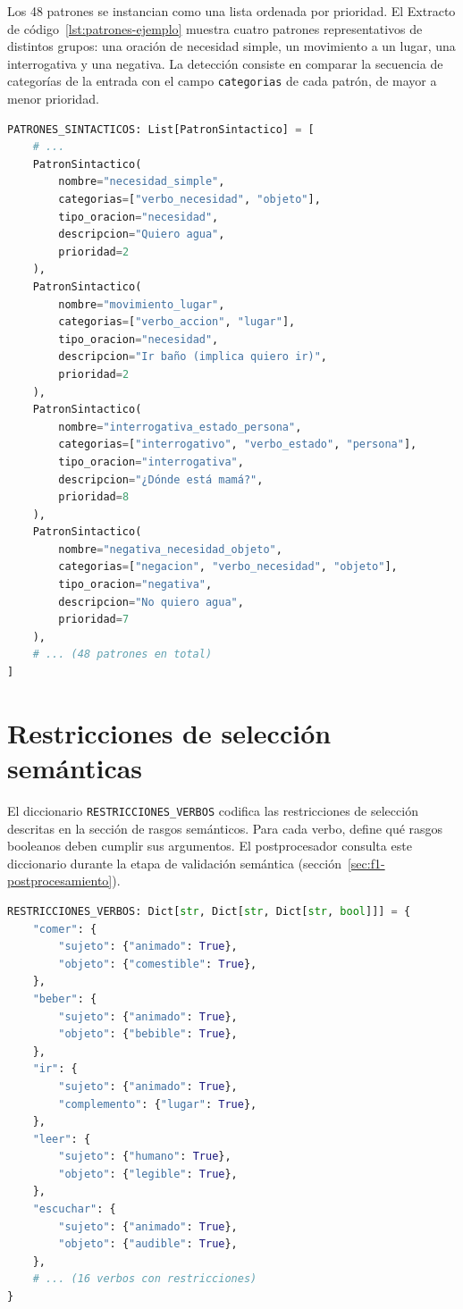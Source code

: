 Los 48 patrones se instancian como una lista ordenada por prioridad. El Extracto de código~\ref{lst:patrones-ejemplo} muestra cuatro patrones representativos de distintos grupos: una oración de necesidad simple, un movimiento a un lugar, una interrogativa y una negativa. La detección consiste en comparar la secuencia de categorías de la entrada con el campo \texttt{categorias} de cada patrón, de mayor a menor prioridad.

\begin{lstlisting}[language=Python,caption={Cuatro patrones sintácticos representativos (\texttt{parser.py}).},label={lst:patrones-ejemplo},basicstyle=\ttfamily\small,xleftmargin=1cm]
PATRONES_SINTACTICOS: List[PatronSintactico] = [
    # ...
    PatronSintactico(
        nombre="necesidad_simple",
        categorias=["verbo_necesidad", "objeto"],
        tipo_oracion="necesidad",
        descripcion="Quiero agua",
        prioridad=2
    ),
    PatronSintactico(
        nombre="movimiento_lugar",
        categorias=["verbo_accion", "lugar"],
        tipo_oracion="necesidad",
        descripcion="Ir baño (implica quiero ir)",
        prioridad=2
    ),
    PatronSintactico(
        nombre="interrogativa_estado_persona",
        categorias=["interrogativo", "verbo_estado", "persona"],
        tipo_oracion="interrogativa",
        descripcion="¿Dónde está mamá?",
        prioridad=8
    ),
    PatronSintactico(
        nombre="negativa_necesidad_objeto",
        categorias=["negacion", "verbo_necesidad", "objeto"],
        tipo_oracion="negativa",
        descripcion="No quiero agua",
        prioridad=7
    ),
    # ... (48 patrones en total)
]
\end{lstlisting}

\section{Restricciones de selección semánticas}

El diccionario \texttt{RESTRICCIONES\_VERBOS} codifica las restricciones de selección descritas en la sección de rasgos semánticos. Para cada verbo, define qué rasgos booleanos deben cumplir sus argumentos. El postprocesador consulta este diccionario durante la etapa de validación semántica (sección~\ref{sec:f1-postprocesamiento}).

\begin{lstlisting}[language=Python,caption={Restricciones de selección semánticas (\texttt{postprocessor.py}).},label={lst:restricciones-verbos},basicstyle=\ttfamily\small,xleftmargin=1cm]
RESTRICCIONES_VERBOS: Dict[str, Dict[str, Dict[str, bool]]] = {
    "comer": {
        "sujeto": {"animado": True},
        "objeto": {"comestible": True},
    },
    "beber": {
        "sujeto": {"animado": True},
        "objeto": {"bebible": True},
    },
    "ir": {
        "sujeto": {"animado": True},
        "complemento": {"lugar": True},
    },
    "leer": {
        "sujeto": {"humano": True},
        "objeto": {"legible": True},
    },
    "escuchar": {
        "sujeto": {"animado": True},
        "objeto": {"audible": True},
    },
    # ... (16 verbos con restricciones)
}
\end{lstlisting}

